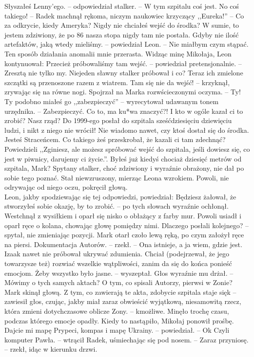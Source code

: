 \documentclass[../MAIN.tex]{subfiles}
\begin{document}
\xx Słyszałeś Lenny’ego. -- odpowiedział stalker. -- W tym szpitalu coś jest.
\xx No coś takiego! -- Radek machnął rękoma, niczym naukowiec krzyczący ,,Eureka!'' -- Co za odkrycie, kiedy Ameryka?
\xx Nigdy nie chciałeś wejść do środka? W sumie, to jestem zdziwiony, że po 86 nasza stopa nigdy tam nie postała.
\xx Gdyby nie ilość artefaktów, jaką wtedy mieliśmy. -- powiedział Leon. -- Nie miałbym czym stąpać. Ten sposób działania anomalii mnie przerasta.
\qd
Widząc minę Mikołaja, Leon kontynuował:
\sx Przecież próbowaliśmy tam wejść. -- powiedział pretensjonalnie. -- Zresztą nie tylko my. Niejeden sławny stalker próbował i co? Teraz ich zmielone szczątki są przenoszone razem z wiatrem. Tam się nie da wejść! -- krzyknął, zrywając się na równe nogi. Spojrzał na Marka rozwścieczonymi oczyma. -- Ty! Ty podobno miałeś go ,,zabezpieczyć'' -- wyrecytował udawanym tonem urzędnika. -- Zabezpieczyć. Co to, ma ku*wa znaczyć?! I kto w ogóle kazał ci to zrobić? Nasz rząd? Do 1999-ego posłał do szpitala sześćdziesięciu dziewięciu ludzi, i nikt z niego nie wrócił! Nie wiadomo nawet, czy ktoś dostał się do środka. Jesteś Straceńcem. Co takiego żeś przeskrobał, że kazali ci tam zdechnąć? Powiedzieli ,,Zginiesz, ale możesz spróbować wejść do szpitala, jeśli dowiesz się, co jest w piwnicy, darujemy ci życie.''. Byłeś już kiedyś chociaż dziesięć metrów od szpitala, Mark?
\qd
Spytany stalker, choć zdziwiony i wyraźnie obrażony, nie dał po sobie tego poznać. Stał niewzruszony, mierząc Leona wzrokiem. Powoli, nie odrywając od niego oczu, pokręcił głową.
\\
Leon, jakby spodziewając się tej odpowiedzi, powiedział:
\sx Będziesz żałował, że stworzyłeś sobie okazję, by to zrobić. -- po tych słowach wyraźnie ochłonął.
\qd
Westchnął z wysiłkiem i oparł się nisko o obłażący z farby mur. Powoli usiadł i oparł ręce o kolana, chowając głowę pomiędzy nimi.
\sx Dlaczego posłali kolejnego? -- spytał, nie zmieniając pozycji.
\qd
Mark otarł czoło lewą ręką, po czym założył ręce na piersi.
\sx Dokumentacja Autorów. -- rzekł. -- Ona istnieje, a ja wiem, gdzie jest.
\qd
Izaak nawet nie próbował ukrywać zdumienia. Chciał (podejrzewał, że jego towarzysze też) rozwiać wszelkie wątpliwości, zanim da się do końca ponieść emocjom.
\sx Żeby wszystko było jasne. -- wyszeptał. Głos wyraźnie mu drżał. -- Mówimy o tych samych aktach? O tym, co spisali Autorzy, pierwsi w Zonie?
\qd
Mark skinął głową.
\sx Z tym, co zawierają te akta, zdobycie szpitala staje się\3k -- zawiesił głos, czując, jakby miał zaraz obwieścić wyjątkową, niesamowitą rzecz, która zmieni dotychczasowe oblicze Zony. -- \3kmożliwe.
\qd
Minęło trochę czasu, podczas którego emocje opadły. Kiedy to nastąpiło, Mikołaj ponowił prośbę.
\sx Dajcie mi mapę Prypeci, kompas i mapę Ukrainy. -- powiedział. -- O\3k
\xx Czyli komputer Pawła. -- wtrącił Radek, uśmiechając się pod nosem. -- Zaraz przyniosę. -- rzekł, idąc w kierunku drzwi.
\qd
\end{document}
